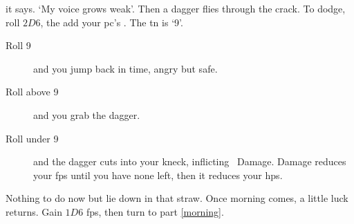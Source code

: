 it says.
`My voice grows weak'.
Then a dagger flies through the crack.
To dodge, roll $2D6$, the add your \gls{pc}'s .
The \gls{tn} is `9'.

\begin{description}
  \item[Roll 9]
  and you jump back in time, angry but safe.
  \item[Roll above 9]
  and you grab the dagger.
  \item[Roll under 9]
  and the dagger cuts into your kneck, inflicting ~Damage.
  Damage reduces your \glspl{fp} until you have none left, then it reduces your \glspl{hp}.
\end{description}

Nothing to do now but lie down in that straw.
Once morning comes, a little luck returns.
Gain $1D6$ \glspl{fp}, then turn to part \vref{morning}.
